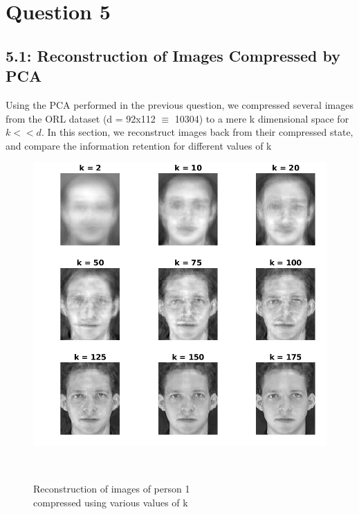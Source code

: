 \documentclass[12pt, a4paper]{article}
\begin{document}
\vspace*{-22pt}
\section*{Question 5}
\subsection*{5.1: Reconstruction of Images Compressed by PCA}
\quad Using the PCA performed in the previous question, we compressed several images from the ORL dataset (d = 92x112 $\equiv$ 10304) to a mere k dimensional space for $k << d$. In this section, we reconstruct images back from their compressed state, and compare the information retention for different values of k
\vspace*{65pt}
\begin{figure}[h!]
    \centering
    \renewcommand{\thefigure}{5.1}
    \begin{minipage}[c][1\width]{0.6\textwidth}
    	\hspace*{-0.8in}
    	\includegraphics[width=1.34\textwidth]{reconstruct.png}
    	\caption{Reconstruction of images of person 1 \\compressed using various values of k}
	    \label{fig:5.1}
    \end{minipage} \\
\end{figure}
\end{document}
